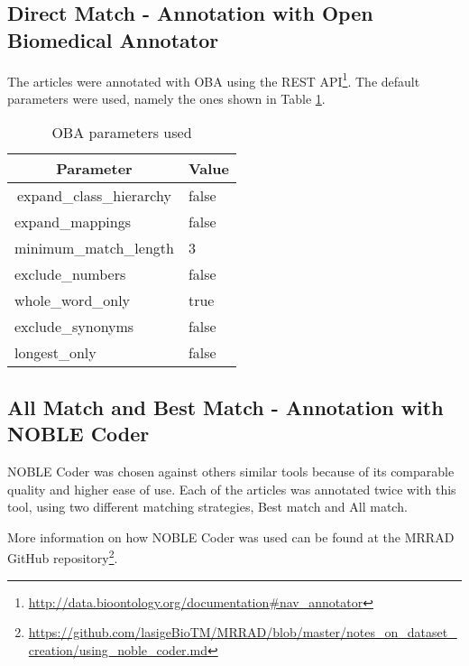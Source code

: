 \subsection{Direct Match - Annotation with Open Biomedical Annotator}

The articles were annotated with OBA using the REST API\footnote{\url{http://data.bioontology.org/documentation\#nav_annotator}}. The default parameters were used, namely the ones shown in Table \ref{table-ncbo-parameters}.

\begin{table}[h]
\centering
\caption{OBA parameters used}
\label{table-ncbo-parameters}
\begin{tabular}{|l|l|}
\hline
\multicolumn{1}{|c|}{\textbf{Parameter}}       & \multicolumn{1}{c|}{\textbf{Value}} \\ \hline
\multicolumn{1}{|c|}{expand\_class\_hierarchy} & false                               \\ \hline
expand\_mappings                               & false                               \\ \hline
minimum\_match\_length                         & 3                                   \\ \hline
exclude\_numbers                               & false                               \\ \hline
whole\_word\_only                              & true                                \\ \hline
exclude\_synonyms                              & false                               \\ \hline
longest\_only                                  & false                               \\ \hline
\end{tabular}
\end{table}

\subsection{All Match and Best Match - Annotation with NOBLE Coder}

NOBLE Coder was chosen against others similar tools because of its comparable quality and higher ease of use. Each of the articles was annotated twice with this tool, using two different matching strategies, Best match and All match.

More information on how NOBLE Coder was used can be found at the MRRAD GitHub repository\footnote{\url{https://github.com/lasigeBioTM/MRRAD/blob/master/notes_on_dataset_creation/using_noble_coder.md}}.

